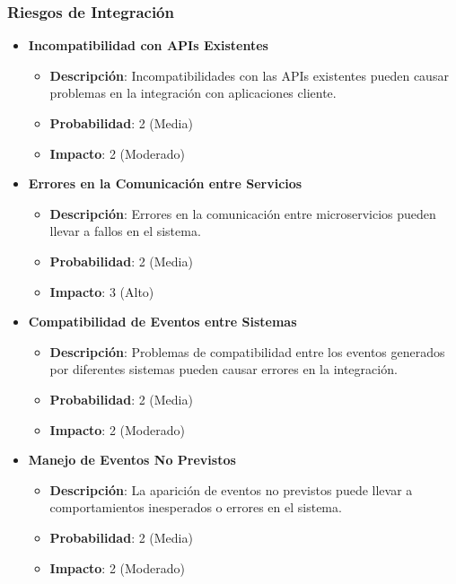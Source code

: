 \documentclass{article}
\begin{document}
\subsubsection{Riesgos de Integración}

\begin{itemize}
    \item \textbf{Incompatibilidad con APIs Existentes}
          \begin{itemize}
              \item \textbf{Descripción}: Incompatibilidades con las APIs existentes pueden causar problemas en la integración con aplicaciones cliente.
              \item \textbf{Probabilidad}: 2 (Media)
              \item \textbf{Impacto}: 2 (Moderado)
          \end{itemize}

    \item \textbf{Errores en la Comunicación entre Servicios}
          \begin{itemize}
              \item \textbf{Descripción}: Errores en la comunicación entre microservicios pueden llevar a fallos en el sistema.
              \item \textbf{Probabilidad}: 2 (Media)
              \item \textbf{Impacto}: 3 (Alto)
          \end{itemize}

    \item \textbf{Compatibilidad de Eventos entre Sistemas}
          \begin{itemize}
              \item \textbf{Descripción}: Problemas de compatibilidad entre los eventos generados por diferentes sistemas pueden causar errores en la integración.
              \item \textbf{Probabilidad}: 2 (Media)
              \item \textbf{Impacto}: 2 (Moderado)
          \end{itemize}

    \item \textbf{Manejo de Eventos No Previstos}
          \begin{itemize}
              \item \textbf{Descripción}: La aparición de eventos no previstos puede llevar a comportamientos inesperados o errores en el sistema.
              \item \textbf{Probabilidad}: 2 (Media)
              \item \textbf{Impacto}: 2 (Moderado)
          \end{itemize}
\end{itemize}
\end{document}
